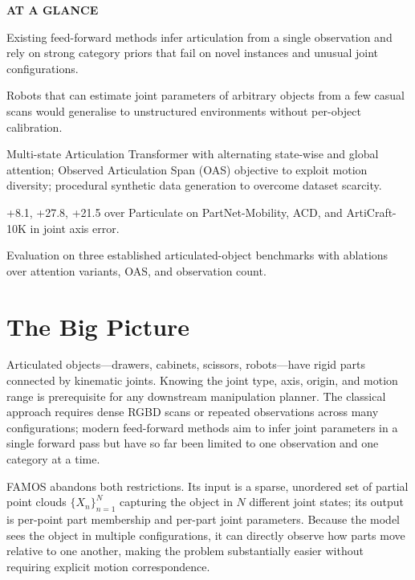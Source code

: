 \documentclass[10pt,twocolumn]{article}
\begin{document}
\begin{mdframed}[backgroundcolor=boxgray,linecolor=rulered,linewidth=1pt,
    innerleftmargin=6pt,innerrightmargin=6pt,
    innertopmargin=6pt,innerbottommargin=6pt]
\textbf{\small AT A GLANCE}\par\vspace{4pt}
\begin{description}[leftmargin=0pt,labelsep=4pt,itemsep=2pt,parsep=0pt,
    font=\small\bfseries]
  \item[Problem:] Existing feed-forward methods infer articulation from a
    single observation and rely on strong category priors that fail on novel
    instances and unusual joint configurations.
  \item[Why it matters:] Robots that can estimate joint parameters of
    arbitrary objects from a few casual scans would generalise to
    unstructured environments without per-object calibration.
  \item[Method:] Multi-state Articulation Transformer with alternating
    state-wise and global attention; Observed Articulation Span (OAS)
    objective to exploit motion diversity; procedural synthetic data
    generation to overcome dataset scarcity.
  \item[Result:] +8.1, +27.8, +21.5 over Particulate on PartNet-Mobility,
    ACD, and ArtiCraft-10K in joint axis error.
  \item[Evidence:] Evaluation on three established articulated-object
    benchmarks with ablations over attention variants, OAS, and
    observation count.
\end{description}
\end{mdframed}

\section{The Big Picture}

Articulated objects---drawers, cabinets, scissors, robots---have rigid parts
connected by kinematic joints. Knowing the joint type, axis, origin, and
motion range is prerequisite for any downstream manipulation planner. The
classical approach requires dense RGBD scans or repeated observations across
many configurations; modern feed-forward methods aim to infer joint parameters
in a single forward pass but have so far been limited to one observation and
one category at a time.

FAMOS abandons both restrictions. Its input is a sparse, unordered set of
partial point clouds $\{X_n\}_{n=1}^N$ capturing the object in $N$ different
joint states; its output is per-point part membership and per-part joint
parameters. Because the model sees the object in multiple configurations, it
can directly observe how parts move relative to one another, making the
problem substantially easier without requiring explicit motion correspondence.
\end{document}
